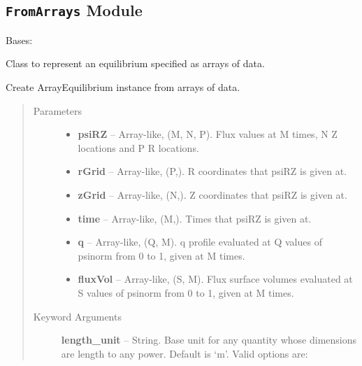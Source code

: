 \documentclass[letterpaper,10pt,english]{sphinxmanual}
\begin{document}
\subsection{\texttt{FromArrays} Module}
\label{eqtools:module-eqtools.FromArrays}\label{eqtools:fromarrays-module}

\begin{fulllineitems}
\label{eqtools:eqtools.FromArrays.ArrayEquilibrium}
Bases: {\hyperref[eqtools:eqtools.core.Equilibrium]{}}

Class to represent an equilibrium specified as arrays of data.

Create ArrayEquilibrium instance from arrays of data.
\begin{quote}\begin{description}
\item[{Parameters }] \leavevmode\begin{itemize}
\item {} 
\textbf{psiRZ} --
Array-like, (M, N, P).
Flux values at M times, N Z locations and P R locations.

\item {} 
\textbf{rGrid} --
Array-like, (P,).
R coordinates that psiRZ is given at.

\item {} 
\textbf{zGrid} --
Array-like, (N,).
Z coordinates that psiRZ is given at.

\item {} 
\textbf{time} --
Array-like, (M,).
Times that psiRZ is given at.

\item {} 
\textbf{q} --
Array-like, (Q, M).
q profile evaluated at Q values of psinorm from 0 to 1, given at M
times.

\item {} 
\textbf{fluxVol} --
Array-like, (S, M).
Flux surface volumes evaluated at S values of psinorm from 0 to 1,
given at M times.

\end{itemize}

\item[{Keyword Arguments}] \leavevmode
\textbf{length\_unit} --
String.
Base unit for any quantity whose dimensions are length to any power.
Default is `m'. Valid options are:


\end{description}
\end{quote}
\end{fulllineitems}
\end{document}
